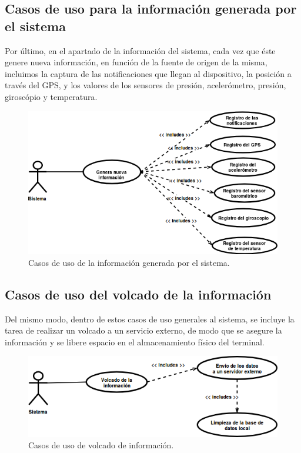 \documentclass[12pt,a4paper,oneside]{book} %
\begin{document}
\subsection{Casos de uso para la información generada por el sistema}
Por último, en el apartado de la información del sistema, cada vez que éste genere nueva información, en función de la fuente de origen de la misma, incluimos la captura de las notificaciones que llegan al dispositivo, la posición a través del GPS, y los valores de los sensores de presión, acelerómetro, presión, giroscópio y temperatura.  
\begin{figure}[H]
	\begin{center}
		\includegraphics[scale=0.70]{pictures/usecases/usecases06.png} %
	\end{center}
	\caption[Casos de uso de la información generada por el sistema.]{Casos de uso de la información generada por el sistema.}
\end{figure}
\subsection{Casos de uso del volcado de la información}
Del mismo modo, dentro de estos casos de uso generales al sistema, se incluye la tarea de realizar un volcado a un servicio externo, de modo que se asegure la información y se libere espacio en el almacenamiento físico del terminal. 
\begin{figure}[H]
	\begin{center}
		\includegraphics[scale=0.7]{pictures/usecases/usecases07.png} %
	\end{center}
	\caption[Casos de uso de volcado de información.]{Casos de uso de volcado de información.}
\end{figure}
\end{document}
